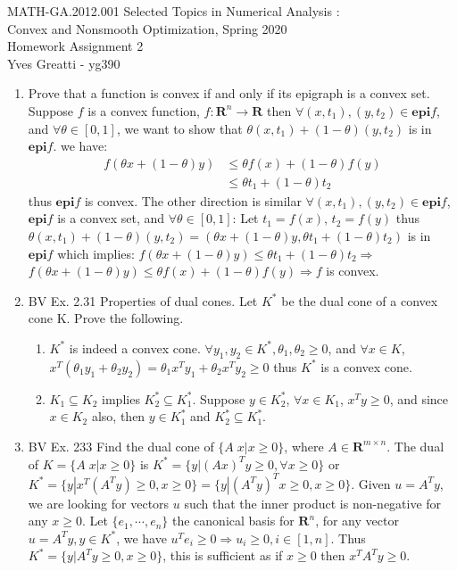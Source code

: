 \documentclass[10pt]{article}
\newcommand{\be}{\begin{enumerate}}
\newcommand{\ee}{\end{enumerate}}
\newcommand{\0}{\mat{0}}
\newcommand{\epi}{\textbf{epi}}
\begin{document}
\noindent MATH-GA.2012.001 Selected Topics in Numerical Analysis :\\
Convex and Nonsmooth Optimization, Spring 2020\\
Homework Assignment 2 \\
Yves Greatti - yg390\\

\begin{enumerate}

\item Prove that a function is convex if and only if its epigraph is a convex set. 
Suppose $f$ is a convex function, $f: \mathbf{R}^n \rightarrow \mathbf{R}$ then $\forall (x, t_1),(y, t_2) \in \epi f$, and $\forall  \theta \in [0, 1]$,
we want to show that $\theta (x, t_1) + (1-\theta) (y, t_2)$ is in $\epi f$.
we have:
\begin{align*}
	f(\theta x + (1-\theta) y)	&\le	\theta f(x) + (1 - \theta) f(y) \\
						&\le	\theta t_1 + (1 - \theta) t_2
\end{align*} thus $\epi f$ is convex. The other direction is similar  $\forall (x, t_1),(y, t_2) \in \epi f$, $\epi f$ is a convex set, and $\forall  \theta \in [0, 1]$:
Let $t_1 = f(x)$, $t_2 = f(y)$ thus $\theta (x, t_1) + (1-\theta) (y, t_2) = (\theta x + (1-\theta) y, \theta t_1 + (1-\theta) t_2)$ is in $\epi f$ which implies: 
$f(\theta x + (1-\theta) y) \le \theta t_1 + (1-\theta) t_2 \Rightarrow$  $f(\theta x + (1-\theta) y) \le \theta f(x) + (1-\theta) f(y) \Rightarrow f$ is convex.

\item BV Ex. 2.31 Properties of dual cones. Let $K^*$ be the dual cone of a convex cone K. Prove the following.
	\be 
		\item $K^*$  is indeed a convex cone.
		$\forall y_1, y_2  \in K^*, \theta_1, \theta_2 \ge 0$, and $\forall x \in K$, 
		$x^T (\theta_1 y_1 + \theta_2 y_2) = \theta_1 x^T y_1 + \theta_2 x^T y_2 \ge 0$ thus $K^*$ is a convex cone.
		
		\item $K_1 \subseteq K_2$ implies $K_2^* \subseteq K_1^*$.
		Suppose $y \in K_2^*$, $\forall x \in K_1$, $x^T y \ge 0$, and since $x \in K_2$ also, then $y \in K_1^*$ and $K_2^* \subseteq K_1^*$.
	\ee
	
\item BV Ex. 233 Find the dual cone of $\{ A \; x | x \ge 0 \}$, where $A \in \mathbf{R}^{m \times n}$. 
The dual of $K = \{ A \; x | x \ge 0 \}$ is $K^* = \{ y | (A x)^T y \ge 0, \forall x \ge 0 \}$ or $K^* = \{ y | x^T (A^T y) \ge 0,  x \ge 0 \} = \{ y | (A^T y)^T x \ge 0, x \ge 0 \}$. 
Given $u = A^T y$, we are looking for vectors $u$ such that the inner product is non-negative for any $x \ge 0$.
Let $\{e_1, \cdots  ,e_n\}$ the canonical basis for $\mathbf{R}^n$, for any vector $u = A^T y, y \in K^*$, we have $u^T e_i \ge 0 \Rightarrow u_i \ge 0, i \in [1,n]$.
Thus $K^* = \{ y | A^T y \ge 0, x \ge 0\}$, this is sufficient as if $ x\ge 0$ then $x^T  A^T y \ge 0$.
	

\end{enumerate}
\end{document}

